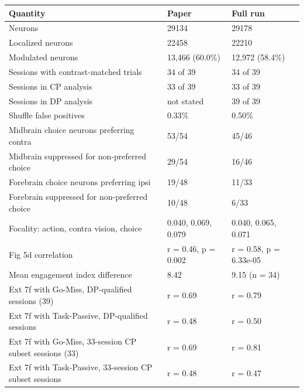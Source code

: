 \begin{longtable}{@{}p{8.2cm}p{3.2cm}p{3.9cm}@{}}
\toprule
Quantity & Paper & Full run \\
\midrule
\endhead
Neurons & 29134 & 29178 \\
Localized neurons & 22458 & 22210 \\
Modulated neurons & 13,466 (60.0\%) & 12,972 (58.4\%) \\
Sessions with contrast-matched trials & 34 of 39 & 34 of 39 \\
Sessions in CP analysis & 33 of 39 & 33 of 39 \\
Sessions in DP analysis & not stated & 39 of 39 \\
Shuffle false positives & 0.33\% & 0.50\% \\
Midbrain choice neurons preferring contra & 53/54 & 45/46 \\
Midbrain suppressed for non-preferred choice & 29/54 & 16/46 \\
Forebrain choice neurons preferring ipsi & 19/48 & 11/33 \\
Forebrain suppressed for non-preferred choice & 10/48 & 6/33 \\
Focality: action, contra vision, choice & 0.040, 0.069, 0.079 & 0.040, 0.065, 0.071 \\
Fig 5d correlation & r = 0.46, p = 0.002 & r = 0.58, p = 6.33e-05 \\
Mean engagement index difference & 8.42 & 9.15 (n = 34) \\
Ext 7f with Go-Miss, DP-qualified sessions (39) & r = 0.69 & r = 0.79 \\
Ext 7f with Task-Passive, DP-qualified sessions & r = 0.48 & r = 0.50 \\
Ext 7f with Go-Miss, 33-session CP subset sessions (33) & r = 0.69 & r = 0.81 \\
Ext 7f with Task-Passive, 33-session CP subset sessions & r = 0.48 & r = 0.47 \\
\bottomrule
\end{longtable}
